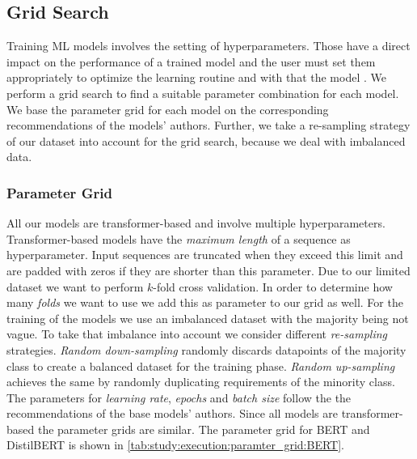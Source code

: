 
\subsection{Grid Search}
\label{chp:study:sec:execution:subsec:gridsearch}
Training \ac{ML} models involves the setting of hyperparameters.
Those have a direct impact on the performance of a trained model and the user must set them appropriately to optimize the learning routine and with that the model \parencite{Claesen:2015}.
We perform a grid search to find a suitable parameter combination for each model.
We base the parameter grid for each model on the corresponding recommendations of the models' authors.
Further, we take a re-sampling strategy of our dataset into account for the grid search, because we deal with imbalanced data.

\subsubsection{Parameter Grid}
\label{chp:study:sec:execution:subsec:gridsearch:parameter_grid}
All our models are transformer-based and involve multiple hyperparameters.
Transformer-based models have the \textit{maximum length} of a sequence as hyperparameter.
Input sequences are truncated when they exceed this limit and are padded with zeros if they are shorter than this parameter.
Due to our limited dataset we want to perform $k$-fold cross validation.
In order to determine how many \textit{folds} we want to use we add this as parameter to our grid as well.
For the training of the models we use an imbalanced dataset with the majority being not vague.
To take that imbalance into account we consider different \textit{re-sampling} strategies.
\textit{Random down-sampling} randomly discards datapoints of the majority class to create a balanced dataset for the training phase.
\textit{Random up-sampling} achieves the same by randomly duplicating requirements of the minority class.
The parameters for \textit{learning rate}, \textit{epochs} and \textit{batch size} follow the the recommendations of the base models' authors.
Since all models are transformer-based the parameter grids are similar.
The parameter grid for \ac{BERT} and \ac{DistilBERT} is shown in \cref{tab:study:execution:paramter_grid:BERT}.

